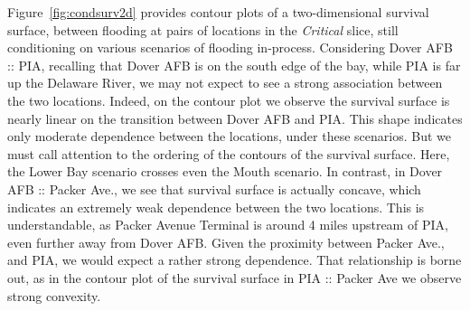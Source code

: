 Figure~\ref{fig:condsurv2d} provides contour plots of a two-dimensional survival surface, 
    between flooding at pairs of locations in the \emph{Critical} slice, still conditioning 
    on various scenarios of flooding in-process.  Considering Dover AFB :: PIA, recalling 
    that Dover AFB is on the south edge of the bay, while PIA is far up the Delaware River, 
    we may not expect to see a strong association between the two locations.  Indeed, on the 
    contour plot we observe the survival surface is nearly linear on the transition between 
    Dover AFB and PIA.   This shape indicates
    only moderate dependence between the locations, under these scenarios.  But we must call 
    attention to the ordering of the contours of the survival surface.  Here, the Lower Bay 
    scenario crosses even the Mouth scenario.  In contrast, in Dover AFB :: Packer Ave., we 
    see that survival surface is actually concave, which indicates an extremely weak 
    dependence between the two locations.  This is understandable, as Packer Avenue Terminal 
    is around 4 miles upstream of PIA, even further away from Dover AFB.  Given the proximity
    between Packer Ave., and PIA, we would expect a rather strong dependence.  That relationship
    is borne out, as in the contour plot of the survival surface in PIA :: Packer Ave we observe 
    strong convexity.





